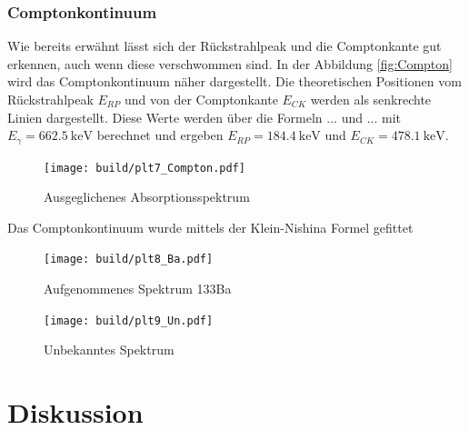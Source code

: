 \subsubsection{Comptonkontinuum}
Wie bereits erwähnt lässt sich der Rückstrahlpeak und die Comptonkante gut erkennen, auch wenn diese verschwommen sind. 
In der Abbildung \eqref{fig:Compton} wird das Comptonkontinuum näher dargestellt. 
Die theoretischen Positionen vom Rückstrahlpeak $E_{RP}$ und von der Comptonkante $E_{CK}$ werden als senkrechte Linien dargestellt. 
Diese Werte werden über die Formeln ... und ... mit $E_{\gamma}=\qty{662.5}{\kilo\eV}$ berechnet und ergeben $E_{RP}=\qty{184.4}{\kilo\eV}$ und $E_{CK}=\qty{478.1}{\kilo\eV}$.

\begin{figure}[H]
    \centering
    \texttt{[image: build/plt7\_Compton.pdf]}
	\caption{Ausgeglichenes Absorptionsspektrum}
	\label{fig:Compton}
\end{figure}

Das Comptonkontinuum wurde mittels der Klein-Nishina Formel gefittet




\begin{figure}
    \centering
    \texttt{[image: build/plt8\_Ba.pdf]}
	\caption{Aufgenommenes Spektrum 133Ba}
	\label{fig:Ba_spektrum}
\end{figure}

\begin{figure}
    \centering
    \texttt{[image: build/plt9\_Un.pdf]}
	\caption{Unbekanntes Spektrum}
	\label{fig:Un_spektrum}
\end{figure}




\section{Diskussion}

\newpage
\printbibliography

